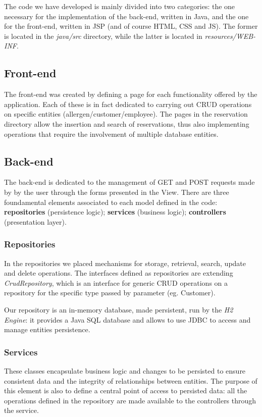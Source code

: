 \documentclass{article}
\begin{document}
\begin{multicols}{2}
    The code we have developed is mainly divided into two categories: the one necessary for the implementation of the back-end, written in Java, and the one for the front-end, written in JSP (and of course HTML, CSS and JS). The former is located in the \textit{java/src} directory, while the latter is located in \textit{resources/WEB-INF}.

    \subsection*{Front-end}
    The front-end was created by defining a page for each functionality offered by the application. Each of these is in fact dedicated to carrying out CRUD operations on specific entities (allergen/customer/employee). The pages in the reservation directory allow the insertion and search of reservations, thus also implementing operations that require the involvement of multiple database entities.

    \subsection*{Back-end}
    The back-end is dedicated to the management of GET and POST requests made by by the user through the forms presented in the View. There are three foundamental elements associated to each model defined in the code: \textbf{repositories} (persistence logic); \textbf{services} (business logic); \textbf{controllers} (presentation layer).

    \subsubsection*{Repositories}
    In the repositories we placed mechanisms for storage, retrieval, search, update and delete operations. The interfaces defined as repositories are extending \textit{CrudRepository}, which is an interface for generic CRUD operations on a repository for the specific type passed by parameter (eg. Customer).

    Our repository is an in-memory database, made persistent, run by the \textit{H2 Engine}: it provides a Java SQL database and allows to use JDBC to access and manage entities persistence.

    \subsubsection*{Services}
    These classes encapsulate business logic and changes to be persisted to ensure consistent data and the integrity of relationships between entities.
    The purpose of this element is also to define a central point of access to persisted data: all the operations defined in the repository are made available to the controllers through the service.

    \end{multicols}
\end{document}
